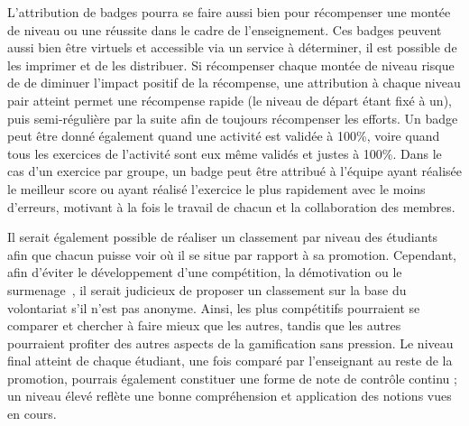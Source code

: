 L'attribution de badges pourra se faire aussi bien pour récompenser une montée de niveau ou une réussite dans le cadre de l'enseignement. Ces badges peuvent aussi bien être virtuels et accessible via un service à déterminer, il est possible de les imprimer et de les distribuer. Si récompenser chaque montée de niveau risque de de diminuer l'impact positif de la récompense, une attribution à chaque niveau pair atteint permet une récompense rapide (le niveau de départ étant fixé à un), puis semi-régulière par la suite afin de toujours récompenser les efforts. Un badge peut être donné également quand une activité est validée à 100\%, voire quand tous les exercices de l'activité sont eux même validés et justes à 100\%. Dans le cas d'un exercice par groupe, un badge peut être attribué à l'équipe ayant réalisée le meilleur score ou ayant réalisé l'exercice le plus rapidement avec le moins d'erreurs, motivant à la fois le travail de chacun et la collaboration des membres. \par

Il serait également possible de réaliser un classement par niveau des étudiants afin que chacun puisse voir où il se situe par rapport à sa promotion. Cependant,  afin d'éviter le développement d'une compétition, la démotivation ou le surmenage~\cite{gamif-educ}, il serait judicieux de proposer un classement sur la base du volontariat s'il n'est pas anonyme. Ainsi, les plus compétitifs pourraient se comparer et chercher à faire mieux que les autres, tandis que les autres pourraient profiter des autres aspects de la gamification sans pression. Le niveau final atteint de chaque étudiant, une fois comparé par l'enseignant au reste de la promotion, pourrais également constituer une forme de note de contrôle continu ; un niveau élevé reflète une bonne compréhension et application des notions vues en cours.

